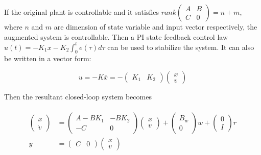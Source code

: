 \documentclass[hyperref]{article}
\theoremstyle{nonumberplain}
\begin{document}
	If the original plant is controllable and it satisfies $rank\begin{pmatrix}
	A &B \\ 
	C &0 
	\end{pmatrix}=n+m$, where $n$ and $m$ are dimension of state variable and input vector respectively, the augmented system is controllable. Then a PI state feedback control law $u(t)=-K_{1}x-K_{2}\int_{0}^{t}e(\tau )d\tau$ can be used to stabilize the system. It can also be written in a vector form:
	
	\begin{equation}
	u=-K\bar{x}=-\begin{pmatrix}
	K_{1} & K_{2}
	\end{pmatrix}\begin{pmatrix}
	x\\ 
	v
	\end{pmatrix}
	\label{eq46}
	\end{equation}
	
	Then the resultant closed-loop system becomes
	
	\begin{equation}
	\begin{split}
	\begin{aligned}
	\begin{pmatrix}
	\dot{x}\\ 
	\dot{v}
	\end{pmatrix}&=\begin{pmatrix}
	A-BK_{1} &-BK_{2} \\ 
	-C & 0
	\end{pmatrix}\begin{pmatrix}
	x\\ 
	v
	\end{pmatrix}+\begin{pmatrix}
	B_{w}\\ 
	0
	\end{pmatrix}w+\begin{pmatrix}
	0\\ 
	I
	\end{pmatrix}r\\
	y&=\begin{pmatrix}
	C &0 
	\end{pmatrix}\begin{pmatrix}
	x\\ 
	v
	\end{pmatrix}
	\end{aligned}
	\end{split}
	\label{eq47}
	\end{equation}
	
\end{document}
